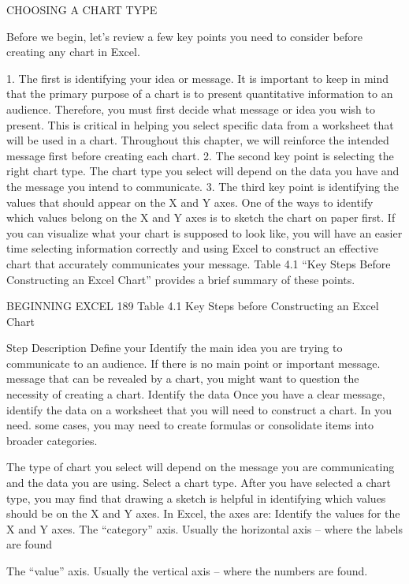 CHOOSING A CHART TYPE

Before we begin, let’s review a few key points you need to consider before creating any chart in Excel.

1. The first is identifying your idea or message. It is important to keep in mind that the primary
purpose of a chart is to present quantitative information to an audience. Therefore, you must
first decide what message or idea you wish to present. This is critical in helping you select
specific data from a worksheet that will be used in a chart. Throughout this chapter, we will
reinforce the intended message first before creating each chart.
2. The second key point is selecting the right chart type. The chart type you select will depend
on the data you have and the message you intend to communicate.
3. The third key point is identifying the values that should appear on the X and Y axes. One of
the ways to identify which values belong on the X and Y axes is to sketch the chart on paper
first. If you can visualize what your chart is supposed to look like, you will have an easier time
selecting information correctly and using Excel to construct an effective chart that accurately
communicates your message. Table 4.1 “Key Steps Before Constructing an Excel Chart”
provides a brief summary of these points.

BEGINNING EXCEL 189
Table 4.1 Key Steps before Constructing an Excel Chart

Step                   Description
Define your            Identify the main idea you are trying to communicate to an audience. If there is no main point or important
message.               message that can be revealed by a chart, you might want to question the necessity of creating a chart.
Identify the data      Once you have a clear message, identify the data on a worksheet that you will need to construct a chart. In
you need.              some cases, you may need to create formulas or consolidate items into broader categories.


The type of chart you select will depend on the message you are communicating and the data you are using.
Select a chart type.
After you have selected a chart type, you may find that drawing a sketch is helpful in identifying which
values should be on the X and Y axes. In Excel, the axes are:
Identify the values
for the X and Y
axes.                  The “category” axis. Usually the horizontal axis – where the labels are found

The “value” axis. Usually the vertical axis – where the numbers are found.


